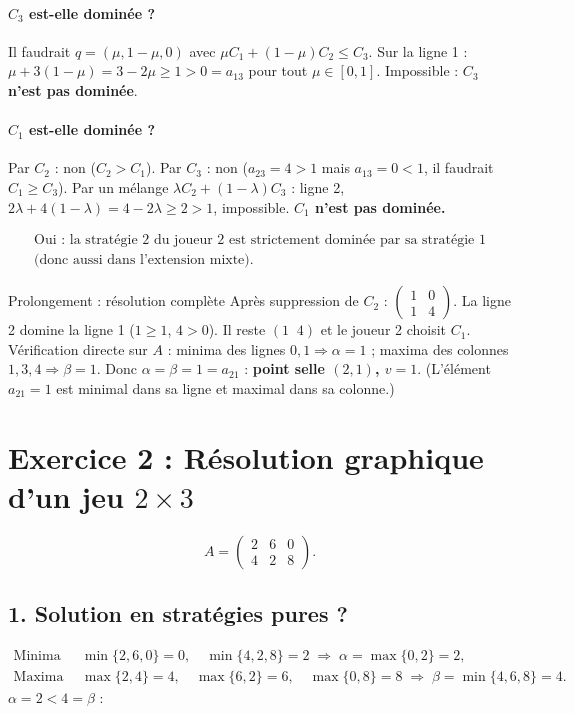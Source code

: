 \documentclass[11pt,a4paper]{article}
\begin{document}
\paragraph{$C_3$ est-elle dominée ?} Il faudrait $q=(\mu,1-\mu,0)$ avec $\mu C_1+(1-\mu)C_2\le C_3$. Sur la ligne 1 : $\mu+3(1-\mu)=3-2\mu\ge 1>0=a_{13}$ pour tout $\mu\in[0,1]$. Impossible : \textbf{$C_3$ n'est pas dominée}.

\paragraph{$C_1$ est-elle dominée ?} Par $C_2$ : non ($C_2>C_1$). Par $C_3$ : non ($a_{23}=4>1$ mais $a_{13}=0<1$, il faudrait $C_1\ge C_3$). Par un mélange $\lambda C_2+(1-\lambda)C_3$ : ligne 2, $2\lambda+4(1-\lambda)=4-2\lambda\ge 2>1$, impossible. \textbf{$C_1$ n'est pas dominée.}

\[
\boxed{\begin{array}{c}\text{Oui : la stratégie 2 du joueur 2 est strictement dominée par sa stratégie 1}\\ \text{(donc aussi dans l'extension mixte).}\end{array}}
\]

\begin{rembox}{Prolongement : résolution complète}
Après suppression de $C_2$ : $\begin{pmatrix}1&0\\1&4\end{pmatrix}$. La ligne 2 domine la ligne 1 ($1\ge1$, $4>0$). Il reste $(1\;\;4)$ et le joueur 2 choisit $C_1$. Vérification directe sur $A$ : minima des lignes $0,1\Rightarrow\alpha=1$ ; maxima des colonnes $1,3,4\Rightarrow\beta=1$. Donc $\alpha=\beta=1=a_{21}$ : \textbf{point selle $(2,1)$, $v=1$}. (L'élément $a_{21}=1$ est minimal dans sa ligne et maximal dans sa colonne.)
\end{rembox}

\section*{Exercice 2 : Résolution graphique d'un jeu $2\times 3$}

\[
A=\begin{pmatrix} 2 & 6 & 0\\ 4 & 2 & 8\end{pmatrix}.
\]

\subsection*{1. Solution en stratégies pures ?}
\begin{align*}
\text{Minima des lignes : } & \min\{2,6,0\}=0,\quad \min\{4,2,8\}=2 \;\Rightarrow\; \alpha=\max\{0,2\}=2,\\
\text{Maxima des colonnes : } & \max\{2,4\}=4,\quad \max\{6,2\}=6,\quad \max\{0,8\}=8 \;\Rightarrow\; \beta=\min\{4,6,8\}=4.
\end{align*}
$\alpha=2<4=\beta$ : 
\end{document}
